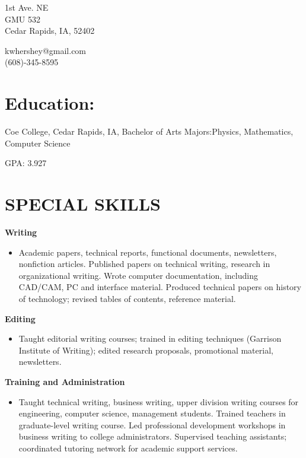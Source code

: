 \documentclass{res}
\begin{document}
 
\setlength\multicolsep{0pt}
\begin{multicols}{2}
 1st Ave. NE\\
\noindent GMU 532\\
\noindent Cedar Rapids, IA, 52402\\
\begin{flushright}
kwhershey@gmail.com\\
(608)-345-8595
\end{flushright}
\end{multicols}
\begin{resume}
\section{Education:}
	\begin{multicols}{2}
	Coe College, Cedar Rapids, IA, Bachelor of Arts
	Majors:Physics,
	Mathematics,
	Computer Science
	\columnbreak
	\begin{flushright}GPA: 3.927\end{flushright}
	\end{multicols}
 
\section{SPECIAL SKILLS} 
\vspace{0.1in}
  {\bf Writing}
    \begin{itemize} %
      \item[] Academic papers, technical reports, functional documents, 
        newsletters, nonfiction articles. Published papers on 
        technical writing, research in organizational writing. 
        Wrote computer documentation, including CAD/CAM, PC and 
        interface material. Produced technical papers on history 
        of technology; revised tables of contents, reference 
        material. 
      \end{itemize}
{\bf Editing} 
       \begin{itemize}
        \item[] Taught editorial writing courses; trained in editing 
        techniques (Garrison Institute of Writing); edited 
        research proposals, promotional material, newsletters.
    \end{itemize}

  {\bf Training and Administration} 
        \begin{itemize}
        \item[] Taught technical writing, business writing, upper 
        division writing courses for engineering, computer 
        science, management students. Trained teachers in 
        graduate-level writing course. Led professional 
        development workshops in business writing to college 
        administrators. Supervised teaching assistants; 
        coordinated tutoring network for academic support 
        services. 
       \end{itemize}


\end{resume}
\end{document}
